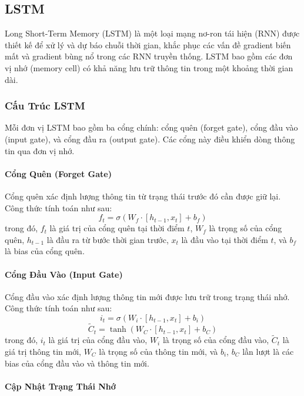 \subsection{LSTM}

Long Short-Term Memory (LSTM) là một loại mạng nơ-ron tái hiện (RNN) được thiết kế để xử lý và dự báo chuỗi thời gian, khắc phục các vấn đề gradient biến mất và gradient bùng nổ trong các RNN truyền thống. LSTM bao gồm các đơn vị nhớ (memory cell) có khả năng lưu trữ thông tin trong một khoảng thời gian dài.

\subsubsection{Cấu Trúc LSTM}

Mỗi đơn vị LSTM bao gồm ba cổng chính: cổng quên (forget gate), cổng đầu vào (input gate), và cổng đầu ra (output gate). Các cổng này điều khiển dòng thông tin qua đơn vị nhớ.

\paragraph{Cổng Quên (Forget Gate)}

Cổng quên xác định lượng thông tin từ trạng thái trước đó cần được giữ lại. Công thức tính toán như sau:
\[
f_t = \sigma(W_f \cdot [h_{t-1}, x_t] + b_f)
\]
trong đó, $f_t$ là giá trị của cổng quên tại thời điểm $t$, $W_f$ là trọng số của cổng quên, $h_{t-1}$ là đầu ra từ bước thời gian trước, $x_t$ là đầu vào tại thời điểm $t$, và $b_f$ là bias của cổng quên.

\paragraph{Cổng Đầu Vào (Input Gate)}

Cổng đầu vào xác định lượng thông tin mới được lưu trữ trong trạng thái nhớ. Công thức tính toán như sau:
\[
i_t = \sigma(W_i \cdot [h_{t-1}, x_t] + b_i)
\]
\[
\tilde{C}_t = \tanh(W_C \cdot [h_{t-1}, x_t] + b_C)
\]
trong đó, $i_t$ là giá trị của cổng đầu vào, $W_i$ là trọng số của cổng đầu vào, $\tilde{C}_t$ là giá trị thông tin mới, $W_C$ là trọng số của thông tin mới, và $b_i$, $b_C$ lần lượt là các bias của cổng đầu vào và thông tin mới.

\paragraph{Cập Nhật Trạng Thái Nhớ}

